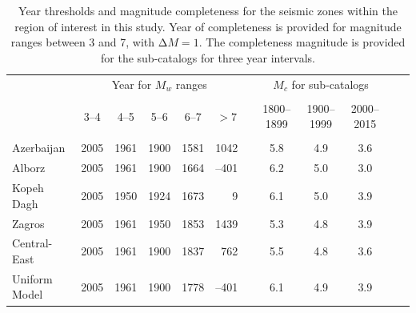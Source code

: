 \begin{table}%
    \centering
    \caption{Year thresholds and magnitude completeness for the seismic zones within the region of interest in this study. Year of completeness is provided for magnitude ranges between 3 and 7, with $\mathrm{\Delta}M = 1$. The completeness magnitude is provided for the sub-catalogs for three year intervals.}
    \begin{tabular}{lccccrcccccc}
        \cline{2-12}                                                                                 \\[-1.6ex]
                        & \multicolumn{5}{c}{Year for $M_w$ ranges}
                                                            & & \multicolumn{3}{c}{$M_c$ for sub-catalogs} & & \\
        \cline{2-6} \cline{8-10}                                                                     \\[-1.6ex]
                        & 3--4 & 4--5 & 5--6 & 6--7 & \multicolumn{1}{c}{$>7$}
                                                            & & 1800--1899 & 1900--1999 & 2000--2015 \\[0.6ex]
        \hline                                                                                       \\[-1.6ex]
        Azerbaijan      & 2005 & 1961 & 1900 & 1581 & 1042  & &     5.8    &     4.9    &     3.6    \\
        Alborz          & 2005 & 1961 & 1900 & 1664 &--401  & &     6.2    &     5.0    &     3.0    \\
        Kopeh Dagh      & 2005 & 1950 & 1924 & 1673 &    9  & &     6.1    &     5.0    &     3.9    \\
        Zagros          & 2005 & 1961 & 1950 & 1853 & 1439  & &     5.3    &     4.8    &     3.9    \\
        Central-East    & 2005 & 1961 & 1900 & 1837 &  762  & &     5.5    &     4.8    &     3.6    \\
        Uniform Model   & 2005 & 1961 & 1900 & 1778 &--401  & &     6.1    &     4.9    &     3.9    \\[0.5ex]
        \hline
    \end{tabular}
    \label{tab:completeness}
\end{table}
